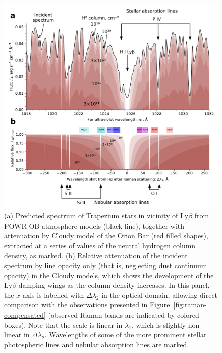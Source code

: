 \documentclass[useAMS, usenatbib, a4paper]{mnras}
\newcommand\lyb{\ensuremath{\text{Ly}\beta}}
\begin{document}
\begin{figure}
  \includegraphics[width=\linewidth]{figs/stellar-spectrum-fuv}
  \caption{(a) Predicted spectrum of Trapezium stars in vicinity of
    \lyb{} from POWR OB atmosphere models (black line), together with
    attenuation by Cloudy model of the Orion Bar (red filled shapes),
    extracted at a series of values of the neutral hydrogen column
    density, as marked. (b) Relative attenuation of the incident
    spectrum by line opacity only (that is, neglecting dust continuum
    opacity) in the Cloudy models, which shows the development of the
    \lyb{} damping wings as the column density increases.  In this
    panel, the \(x\) axis is labelled with \(\Delta\lambda_2\) in the optical
    domain, allowing direct comparison with the observations presented
    in Figure~\ref{fig:raman-compensated} (observed Raman bands are
    indicated by colored boxes). Note that the scale is linear in
    \(\lambda_1\), which is slightly non-linear in
    \(\Delta\lambda_2\).  Wavelengths of some of the more prominent stellar
    photospheric lines and nebular absorption lines are marked. }
  \label{fig:stellar-spectrum-fuv}
\end{figure}
\end{document}
